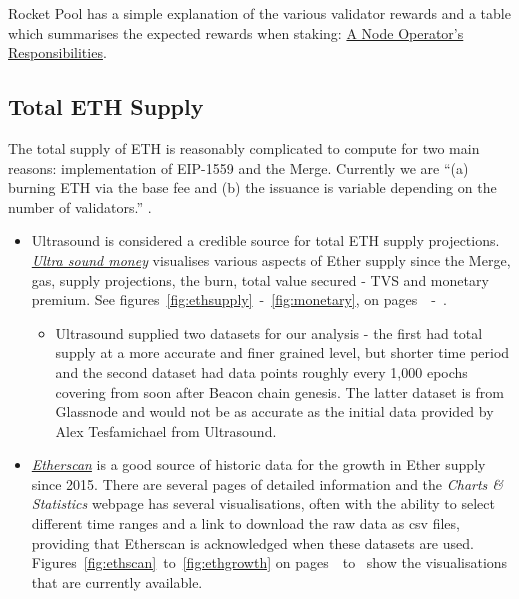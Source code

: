 \documentclass[UTF8]{article}
\begin{document}
Rocket Pool has a simple explanation of the various validator rewards and a table which summarises the expected rewards when staking: \href{https://docs.rocketpool.net/guides/node/responsibilities.html}{A Node Operator's Responsibilities}.
\clearpage
 \subsection{Total ETH Supply}
\label{sec:ethsupply} 
        The total supply of ETH is reasonably complicated to compute for two main reasons:  implementation of EIP-1559 and the Merge.
Currently we are ``(a) burning ETH via the base fee and (b) the issuance is variable depending on the number of validators.'' \cite{Edgington2023}. 
\begin{itemize}
	\item Ultrasound is considered a credible source for total ETH supply projections. \\\textit{\href{https://ultrasound.money/}{Ultra sound money}} visualises various aspects of Ether supply since the Merge, gas, supply projections, the burn, total value secured - TVS and monetary premium. See figures~\ref{fig:ethsupply}~-~\ref{fig:monetary}, on pages~\pageref{fig:ethsupply}~-~\pageref{fig:monetary}.  

\begin{itemize}
	\item Ultrasound supplied two datasets for our analysis - the first had total supply at a more accurate and finer grained level, but shorter time period and the second dataset had data points roughly every 1,000 epochs covering from soon after Beacon chain genesis. The latter dataset is from Glassnode and would not be as accurate as the initial data provided by Alex Tesfamichael from Ultrasound.
\end{itemize}
	\item \textit{\href{https://etherscan.io/chart/ethersupplygrowth}{Etherscan}} is a good source of historic data for the growth in Ether supply since 2015. There are several pages of detailed information and the \textit{Charts \& Statistics} webpage has several visualisations, often with the ability to select different time ranges and a link to download the raw data as csv files, providing that Etherscan is acknowledged when these datasets are used.\\
	Figures~\ref{fig:ethscan}~to~\ref{fig:ethgrowth} on pages~\pageref{fig:ethscan}~to~\pageref{fig:ethgrowth} show the visualisations that are currently available.
\end{itemize}
\end{document}
